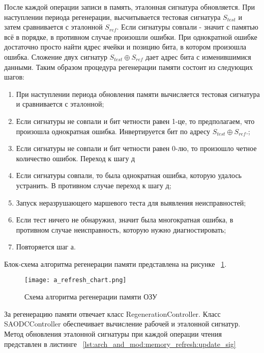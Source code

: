 После каждой операции записи в память, эталонная сигнатура обновляется. При наступлении периода регенерации, высчитывается тестовая сигнатура $S_{test}$ и затем сравнивается с эталонной $S_{ref}$. Если сигнатуры совпали - значит с памятью всё в порядке, в противном случае произошли ошибки. При однократной ошибке достаточно просто найти ядрес ячейки и позицию бита, в котором произошла ошибка. Сложение двух сигнатур  $S_{test} \oplus S_{ref}$ дает адрес бита с изменившимися данными. Таким образом процедура регенерации памяти состоит из следующих шагов:
\begin{enumerate}
  \item При наступлении периода обновления памяти вычисляется тестовая сигнатура и сравнивается с эталонной;
  \item Если сигнатуры не совпали и бит четности равен 1-це, то предполагаем, что произошла однократная ошибка. Инвертируется бит по адресу $S_{test} \oplus S_{ref}$.;
  \item Если сигнатуры не совпали и бит четности равен 0-лю, то произошло четное количество ошибок. Переход к шагу д
  \item Если сигнатуры совпали, то была однократная ошибка, которую удалось устранить. В противном случае переход к шагу д;
  \item Запуск неразрушающего маршевого теста для выявления неисправностей;
  \item Если тест ничего не обнаружил, значит была многократная ошибка, в противном случае неисправность, которую нужно диагностировать;
  \item Повторяется шаг а.
\end{enumerate}

Блок-схема алгоритма регенерации памяти представлена на рисунке ~\ref{fig:arch_and_mod:memory_refresh:refresh_chart}.

\begin{figure}[ht]
\centering
  \texttt{[image: a\_refresh\_chart.png]}  
  \caption{Схема алгоритма регенерации памяти ОЗУ}
  \label{fig:arch_and_mod:memory_refresh:refresh_chart}
\end{figure}

За регенерацию памяти отвечает класс RegenerationController. Класс SAODCController обеспечивает вычисление рабочей и эталонной сигнатур. Метод обновления эталонной сигнатуры при каждой операции чтения представлен в листинге ~\ref{lst:arch_and_mod:memory_refresh:update_sig}

